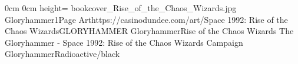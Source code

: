 \documentclass[letterpaper,openany,twoside,twocolumn]{book}
\begin{document}
	\DungeonSheetGeometry

		{0cm}%
		{0cm}%
		{height=\paperheight}%
		{bookcover_Rise_of_the_Chaos_Wizards.jpg}%
		{%
			{Gloryhammer1}{Page \thepage}{Art}{https://casinodundee.com/art/}{Space 1992: Rise of the Chaos Wizards}{GLORYHAMMER}%
		}%
		{{\darkcrystalfont}{Gloryhammer}{\digitalfont}{Rise of the Chaos Wizards}}%
		{{\digitalfont}{The Gloryhammer - Space 1992: Rise of the Chaos Wizards Campaign}}%
		{GloryhammerRadioactive/black}%
	
	\clearpage
	\tableofcontents
	
	\DndSetThemeColor[PhbTan]
\end{document}
